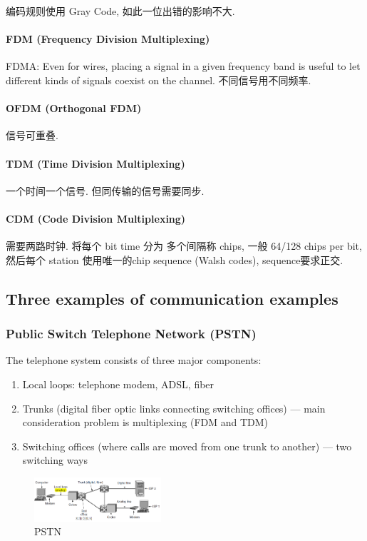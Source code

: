 编码规则使用 Gray Code, 如此一位出错的影响不大. 

\paragraph{FDM (Frequency Division Multiplexing)} FDMA: Even for wires, placing a signal in a given frequency band is useful to let different kinds of signals coexist on the channel. 不同信号用不同频率. 

\paragraph{OFDM (Orthogonal FDM)} 信号可重叠. 

\paragraph{TDM (Time Division Multiplexing)}一个时间一个信号. 但同传输的信号需要同步. 

\paragraph{CDM (Code Division Multiplexing)}需要两路时钟. 将每个 bit  time 分为 多个间隔称 chips, 一般 64/128 chips per bit, 然后每个 station 使用唯一的chip sequence (Walsh codes), sequence要求正交. 


\subsection{Three examples of communication examples}
\subsubsection{Public Switch Telephone Network (PSTN) }
The telephone system consists of three major components:
\begin{enumerate}
    \item Local loops: telephone modem, ADSL, fiber
    \item Trunks (digital fiber optic links connecting switching offices) --- main consideration problem is multiplexing (FDM and TDM)
    \item Switching offices (where calls are moved from one trunk to  another) --- two switching ways
\end{enumerate}

\begin{figure}[!htb]
    \centering
    \includegraphics[width=0.42\textwidth]{pic/CN2/PSTN}
    \caption{PSTN}
\end{figure}

